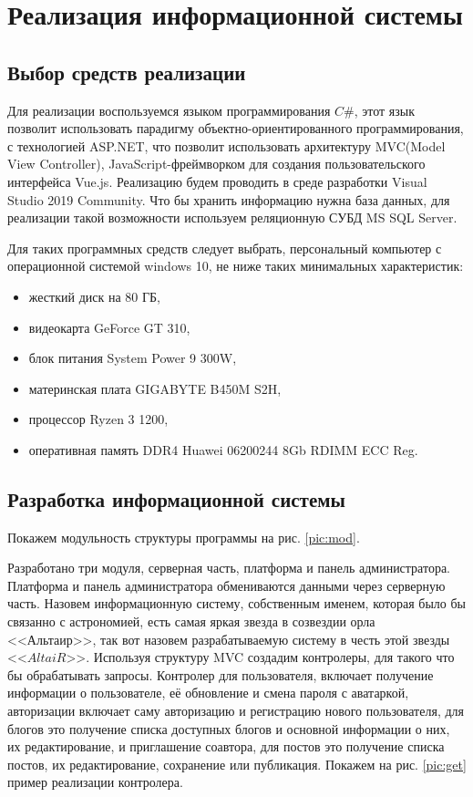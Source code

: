 \section{Реализация информационной системы}
\subsection{Выбор средств реализации}

Для реализации воспользуемся языком программирования $C\#$, этот язык позволит использовать парадигму объектно-ориентированного программирования, с технологией ASP.NET, что позволит использовать архитектуру MVC(Model View Controller), JavaScript-фреймворком для создания пользовательского интерфейса Vue.js. Реализацию будем проводить в среде разработки Visual Studio 2019 Community. Что бы хранить информацию нужна база данных, для реализации такой возможности используем реляционную СУБД MS SQL Server. 

Для таких программных средств следует выбрать, персональный компьютер с операционной системой windows 10, не ниже таких минимальных характеристик:
\begin{itemize}
	\item жесткий диск на 80 ГБ, 
	\item видеокарта GeForce GT 310,
	\item блок питания System Power 9 300W,
	\item материнская плата GIGABYTE B450M S2H,
	\item процессор Ryzen 3 1200,
	\item оперативная память DDR4 Huawei 06200244 8Gb RDIMM ECC Reg.
\end{itemize}

\pagebreak

\subsection{Разработка информационной системы}

Покажем модульность структуры программы на рис. \ref{pic:mod}.



Разработано три модуля, серверная часть, платформа и панель администратора. Платформа и панель администратора обмениваются данными через серверную часть. Назовем информационную систему, собственным именем, которая было бы связанно с астрономией, есть самая яркая звезда в созвездии орла <<Альтаир>>, так вот назовем разрабатываемую систему в честь этой звезды <<$AltaiR$>>. Используя структуру MVC создадим контролеры, для такого что бы обрабатывать запросы. Контролер для пользователя, включает получение информации о пользователе, её обновление и смена пароля с аватаркой, авторизации включает саму авторизацию и регистрацию нового пользователя, для блогов это получение списка доступных блогов и основной информации о них, их редактирование, и приглашение соавтора, для постов это получение списка постов, их редактирование, сохранение или публикация. Покажем на рис. \ref{pic:get} пример реализации контролера.

